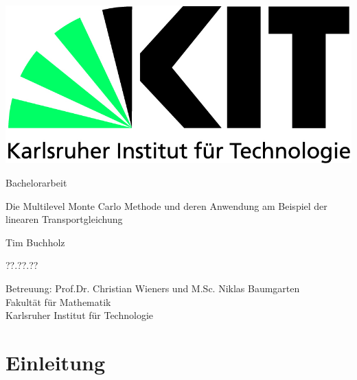 \documentclass[12pt,a4paper]{scrartcl}
\theoremstyle{definition}
\numberwithin{equation}{section}
\begin{document}
  \pagestyle{empty}
  
  
  \begin{titlepage}

    \includegraphics[scale=0.45]{kit-logo.jpg} 
    \vspace*{2cm} 

 \begin{center} \large 
    
    Bachelorarbeit
    \vspace*{2cm}

    {\huge Die Multilevel Monte Carlo Methode und deren Anwendung am Beispiel der linearen Transportgleichung}
    \vspace*{2.5cm}

    Tim Buchholz
    \vspace*{1.5cm}

    ??.??.??
    \vspace*{4.5cm}


    Betreuung: Prof.Dr. Christian Wieners und M.Sc. Niklas Baumgarten \\[1cm]
    Fakultät für Mathematik \\[1cm]
		Karlsruher Institut für Technologie
  \end{center}
\end{titlepage}



  \tableofcontents

\newpage
 


  \pagestyle{headings}

\section{Einleitung}

\end{document}
